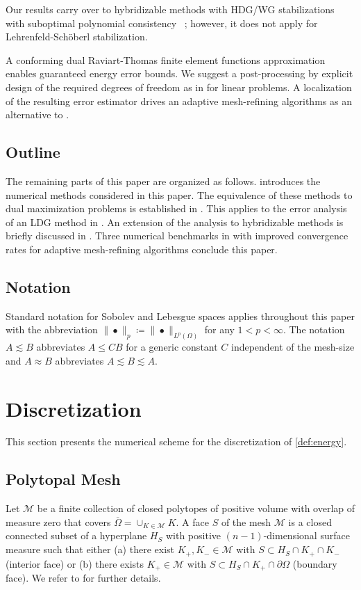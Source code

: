 \documentclass[a4paper]{amsart}
\numberwithin{equation}{section}
\theoremstyle{remark}
\begin{document}
Our results carry over to hybridizable methods with  HDG/WG stabilizations \cite{CockburnGopalakrishnanLazarov2009} with suboptimal polynomial consistency ~\cite[Remark 2.9]{DiPietroDroniou2017}; however, it does not apply 
for Lehrenfeld-Sch\"oberl stabilization.

A conforming dual  Raviart-Thomas finite element functions  approximation 
enables guaranteed energy error bounds. We suggest a post-processing by
explicit design of the required degrees of freedom as in \cite{ErnStephansenVohralik2010} for linear problems. 
A localization of the resulting error estimator drives an 
adaptive mesh-refining algorithms as an alternative to \cite{CarstensenTran2021}. 

\subsection{Outline}
The remaining parts of this paper are organized as follows.  introduces the numerical methods considered in this paper. The equivalence of these methods to dual maximization problems is established in . This applies to the error analysis of an LDG method in . 
An extension of the analysis to hybridizable methods is briefly discussed in .
Three numerical benchmarks in  
with improved convergence rates for adaptive mesh-refining algorithms
conclude this paper.  

\subsection{Notation}
Standard notation for Sobolev and Lebesgue spaces applies throughout this paper with the abbreviation $\|\bullet\|_p \coloneqq \|\bullet\|_{L^p(\Omega)}$ for any $1 < p < \infty$.
The notation $A \lesssim B$ abbreviates $A \leq CB$ for a generic constant $C$ independent of the mesh-size and $A \approx B$ abbreviates $A \lesssim B \lesssim A$.

\section{Discretization}\label{sec:discretization}
This section presents the numerical scheme for the discretization of \eqref{def:energy}.

\subsection{Polytopal Mesh}\label{sec:triangulation}
Let $\mathcal{M}$ be a finite collection of closed polytopes of positive volume with overlap of measure zero that covers $\overline{\Omega} = \cup_{K \in \mathcal{M}} K$.
A face $S$ of the mesh $\mathcal{M}$ is a closed connected subset of a hyperplane $H_S$ with positive $(n-1)$-dimensional surface measure such that either (a) there exist $K_+,K_- \in \mathcal{M}$ with $S \subset H_S \cap K_+ \cap K_-$ (interior face) or (b) there exists $K_+ \in \mathcal{M}$ with $S \subset H_S \cap K_+ \cap \partial \Omega$ (boundary face). We refer to \cite[Section 1.1]{DiPietroDroniou2017} for further details.
\end{document}
